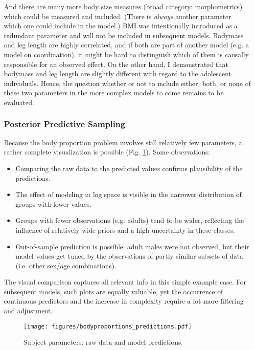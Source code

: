 And there are many more body size measures (broad category: morphometrics) which could be measured and included.
(There is \emph{always} another parameter which one could include in the model.)
BMI was intentionally introduced as a redundant parameter and will not be included in subsequent models.
Bodymass and leg length are highly correlated, and if both are part of another model (e.g. a model on coordination), it might be hard to distinguish which of them is causally responsible for an observed effect.
On the other hand, I demonstrated that bodymass and leg length are slightly different with regard to the adolescent individuals.
Hence, the question whether or not to include either, both, or none of these two parameters in the more complex models to come remains to be evaluated.

\subsubsection{Posterior Predictive Sampling}
\label{sec:org805e0cf}
Because the body proportion problem involves still relatively few parameters, a rather complete visualization is possible (Fig. \ref{fig:bodyproportions}).
Some observations:
\begin{itemize}
\item Comparing the raw data to the predicted values confirms plausibility of the predictions.
\item The effect of modeling in log space is visible in the narrower distribution of groups with lower values.
\item Groups with fewer observations (e.g. adults) tend to be wider, reflecting the influence of relatively wide priors and a high uncertainty in these classes.
\item Out-of-sample prediction is possible: adult males were not observed, but their model values get tuned by the observations of partly similar subsets of data (i.e. other sex/age combinations).
\end{itemize}

The visual comparison captures all relevant info in this simple example case.
For subsequent models, such plots are equally valuable, yet the occurrence of continuous predictors and the increase in complexity require a lot more filtering and adjustment.

\begin{figure}[p]
\centering
\texttt{[image: figures/bodyproportions\_predictions.pdf]}
\caption{\label{fig:bodyproportions}Subject parameters: raw data and model predictions.}
\end{figure}


